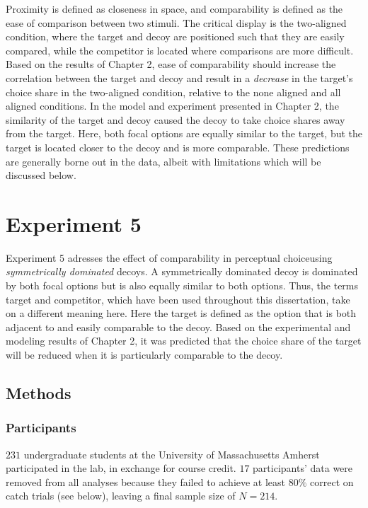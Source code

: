 Proximity is defined as closeness in space, and comparability is defined as the ease of comparison between two stimuli. The critical display is the two-aligned condition, where the target and decoy are positioned such that they are easily compared, while the competitor is located where comparisons are more difficult. Based on the results of Chapter 2, ease of comparability should increase the correlation between the target and decoy and result in a \textit{decrease} in the target's choice share in the two-aligned condition, relative to the none aligned and all aligned conditions. In the model and experiment presented in Chapter 2, the similarity of the target and decoy caused the decoy to take choice shares away from the target. Here, both focal options are equally similar to the target, but the target is located closer to the decoy and is more comparable. These predictions are generally borne out in the data, albeit with limitations which will be discussed below.


\section{Experiment 5}
Experiment 5 adresses the effect of comparability in perceptual choiceusing \textit{symmetrically dominated} decoys. A symmetrically dominated decoy is dominated by both focal options but is also equally similar to both options. Thus, the terms target and competitor, which have been used throughout this dissertation, take on a different meaning here. Here the target is defined as the option that is both adjacent to and easily comparable to the decoy. Based on the experimental and modeling results of Chapter 2, it was predicted that the choice share of the target will be reduced when it is particularly comparable to the decoy.

\subsection{Methods}

\subsubsection{Participants}
$231$ undergraduate students at the University of Massachusetts Amherst participated in the lab, in exchange for course credit. $17$ participants' data were removed from all analyses because they failed to achieve at least $80\%$ correct on catch trials (see below), leaving a final sample size of $N=214$. 

